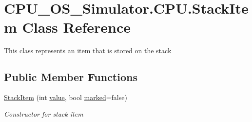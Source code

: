 \hypertarget{class_c_p_u___o_s___simulator_1_1_c_p_u_1_1_stack_item}{}\section{C\+P\+U\+\_\+\+O\+S\+\_\+\+Simulator.\+C\+P\+U.\+Stack\+Item Class Reference}
\label{class_c_p_u___o_s___simulator_1_1_c_p_u_1_1_stack_item}


This class represents an item that is stored on the stack  


\subsection*{Public Member Functions}
\begin{DoxyCompactItemize}
\item 
\hyperlink{class_c_p_u___o_s___simulator_1_1_c_p_u_1_1_stack_item_a0a2381f0b16e0b6665239c0a032701ee}{Stack\+Item} (int \hyperlink{class_c_p_u___o_s___simulator_1_1_c_p_u_1_1_stack_item_a114a8ae5aae9b8c45e2e0c36ce856cd2}{value}, bool \hyperlink{class_c_p_u___o_s___simulator_1_1_c_p_u_1_1_stack_item_a39244e0760a2eb2465d24954d178bd1c}{marked}=false)
\begin{DoxyCompactList}\small\item\em Constructor for stack item \end{DoxyCompactList}\end{DoxyCompactItemize}
